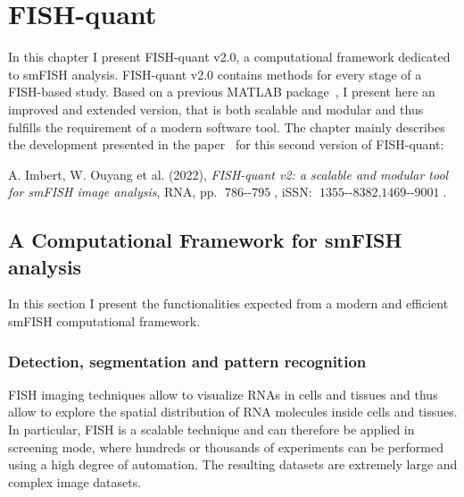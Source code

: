 
\graphicspath{{./figures/chapter1/}}

\chapter{FISH-quant}
\label{ch:chapter1}

\minitoc
\newpage

In this chapter I present FISH-quant v2.0, a computational framework dedicated to \ac{smFISH} analysis. FISH-quant v2.0 contains methods for every stage of a \ac{FISH}-based study.
Based on a previous MATLAB package~\cite{mueller_fish-quant_2013}, I present here an improved and extended version, that is both scalable and modular and thus fulfills the requirement of a modern software tool. The chapter mainly describes the development presented in the paper~\cite{Imbert_fq_2022} for this second version of FISH-quant:

\begin{center}
	\color{green}
	A. Imbert, W. Ouyang et al. (2022), \textit{FISH-quant v2: a scalable and modular tool for smFISH image analysis}, RNA, pp. $\operatorname{786--795}$, iSSN: $\operatorname{1355--8382, 1469--9001}$.
\end{center}

\section{A Computational Framework for smFISH analysis}
\label{sec:framework}

In this section I present the functionalities expected from a modern and efficient \ac{smFISH} computational framework. 

\subsection{Detection, segmentation and pattern recognition}
\label{subsec:pipeline_stages}

\ac{FISH} imaging techniques allow to visualize RNAs in cells and tissues and thus allow to explore the spatial distribution of RNA molecules inside cells and tissues. In particular, \ac{FISH} is a scalable technique and can therefore be applied in screening mode, where hundreds or thousands of experiments can be performed using a high degree of automation. The resulting datasets are extremely large and complex image datasets. 

